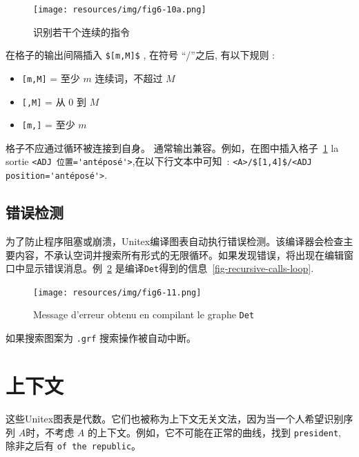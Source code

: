 \begin{figure}[h!]
\begin{center}
\texttt{[image: resources/img/fig6-10a.png]}
\caption{识别若干个连续的指令\label{intervals}}
\end{center}
\end{figure}

\noindent  在格子的输出间隔插入 \verb+$[m,M]$+ ,
在符号 ``/''之后, 有以下规则 : 
\begin{itemize}
\item \verb+[m,M]+ = 至少 $m$ 连续词，不超过 $M$
\item \verb+[,M]+ = 从 0 到 $M$  
\item \verb+[m,]+ = 至少 $m$
\end{itemize}

\noindent 格子不应通过循环被连接到自身。
通常输出兼容。例如，在图中插入格子~\ref{intervals}
la sortie \verb+<ADJ 位置='antéposé'>+,在以下行文本中可知~: \verb+<A>/$[1,4]$/<ADJ position='antéposé'>+. 

\subsection{错误检测}
为了防止程序阻塞或崩溃，Unitex编译图表自动执行错误检测。该编译器会检查主要内容，不承认空词并搜索所有形式的无限循环。如果发现错误，将出现在编辑窗口中显示错误消息。例~\ref{fig-error-message} 是编译\verb+Det+得到的信息~\ref{fig-recursive-calls-loop}.

\begin{figure}[!h]
\begin{center}
\texttt{[image: resources/img/fig6-11.png]}
\caption{Message d’erreur obtenu en compilant le graphe
\texttt{Det}\label{fig-error-message}}
\end{center}
\end{figure}

\noindent 如果搜索图案为 \verb+.grf+ 搜索操作被自动中断。


\section{上下文}
\label{section-contexts}

这些Unitex图表是代数。它们也被称为上下文无关文法，因为当一个人希望识别序列 $A$时，不考虑 $A$ 的上下文。例如，它不可能在正常的曲线，找到 \verb+president+, 
除非之后有 \verb+of the republic+。


